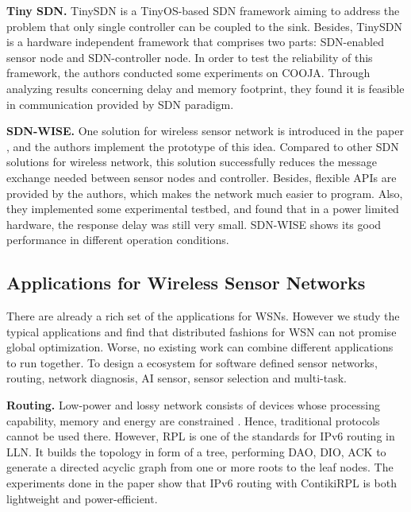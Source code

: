 \textbf{Tiny SDN.}
TinySDN \cite{de2015tinysdn} is a TinyOS-based SDN framework aiming to 
address the problem that only single controller can be coupled to the sink. 
Besides, TinySDN is a hardware independent framework that comprises two parts: 
SDN-enabled sensor node and SDN-controller node. 
In order to test the reliability of this framework, the authors conducted some experiments on COOJA. 
Through analyzing results concerning delay and memory 
footprint, they found it is feasible in communication provided by SDN paradigm.

\textbf{SDN-WISE.}
One solution for wireless sensor network is introduced in the paper \cite{galluccio2015sdn}, 
and the authors implement the prototype of this idea. Compared to other SDN solutions for wireless network, 
this solution successfully reduces the message exchange needed between sensor nodes and controller. 
Besides, flexible APIs are provided by the authors, which makes the network much easier to program. 
Also, they implemented some experimental testbed, and found that in a power limited hardware, the response delay was still very small. 
SDN-WISE shows its good performance in different operation conditions.


\subsection{Applications for Wireless Sensor Networks}


There are already a rich set of the applications for WSNs. 
However we study the typical applications and find that
distributed fashions for WSN can not 
promise global optimization. %
Worse, no existing work can combine different applications to run together.
To design a ecosystem for software defined sensor networks, 
routing, network diagnosis, AI sensor, sensor selection and multi-task.




\textbf{Routing.}
Low-power and lossy network consists of devices whose processing capability, 
memory and energy are constrained \cite{Winter2012}. Hence, traditional 
protocols cannot be used there. However, RPL is one of the standards for IPv6\cite{Deering1998Internet} routing in LLN. 
It builds the topology in form of a tree, performing DAO, DIO, ACK to generate a directed acyclic graph 
from one or more roots to the leaf nodes. The experiments done in the paper \cite{Tsiftes2010a} show 
that IPv6 routing with ContikiRPL is both lightweight and power-efficient.
 
